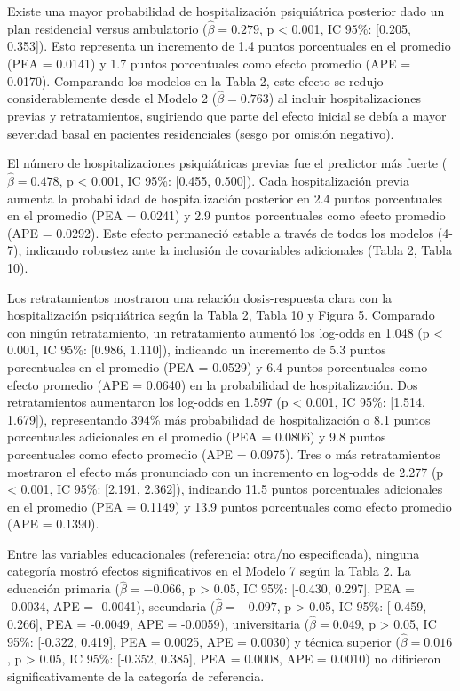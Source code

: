 \documentclass[
  spanish,
  10pt,
]{article}
\begin{document}
Existe una mayor probabilidad de hospitalización psiquiátrica posterior
dado un plan residencial versus ambulatorio (\(\hat{\beta} = 0.279\), p
\textless{} 0.001, IC 95\%: {[}0.205, 0.353{]}). Esto representa un
incremento de 1.4 puntos porcentuales en el promedio (PEA = 0.0141) y
1.7 puntos porcentuales como efecto promedio (APE = 0.0170). Comparando
los modelos en la Tabla 2, este efecto se redujo considerablemente desde
el Modelo 2 (\(\hat{\beta} = 0.763\)) al incluir hospitalizaciones
previas y retratamientos, sugiriendo que parte del efecto inicial se
debía a mayor severidad basal en pacientes residenciales (sesgo por
omisión negativo).

El número de hospitalizaciones psiquiátricas previas fue el predictor
más fuerte (\(\hat{\beta} = 0.478\), p \textless{} 0.001, IC 95\%:
{[}0.455, 0.500{]}). Cada hospitalización previa aumenta la probabilidad
de hospitalización posterior en 2.4 puntos porcentuales en el promedio
(PEA = 0.0241) y 2.9 puntos porcentuales como efecto promedio (APE =
0.0292). Este efecto permaneció estable a través de todos los modelos
(4-7), indicando robustez ante la inclusión de covariables adicionales
(Tabla 2, Tabla 10).

Los retratamientos mostraron una relación dosis-respuesta clara con la
hospitalización psiquiátrica según la Tabla 2, Tabla 10 y Figura 5.
Comparado con ningún retratamiento, un retratamiento aumentó los
log-odds en 1.048 (p \textless{} 0.001, IC 95\%: {[}0.986, 1.110{]}),
indicando un incremento de 5.3 puntos porcentuales en el promedio (PEA =
0.0529) y 6.4 puntos porcentuales como efecto promedio (APE = 0.0640) en
la probabilidad de hospitalización. Dos retratamientos aumentaron los
log-odds en 1.597 (p \textless{} 0.001, IC 95\%: {[}1.514, 1.679{]}),
representando 394\% más probabilidad de hospitalización o 8.1 puntos
porcentuales adicionales en el promedio (PEA = 0.0806) y 9.8 puntos
porcentuales como efecto promedio (APE = 0.0975). Tres o más
retratamientos mostraron el efecto más pronunciado con un incremento en
log-odds de 2.277 (p \textless{} 0.001, IC 95\%: {[}2.191, 2.362{]}),
indicando 11.5 puntos porcentuales adicionales en el promedio (PEA =
0.1149) y 13.9 puntos porcentuales como efecto promedio (APE = 0.1390).

Entre las variables educacionales (referencia: otra/no especificada),
ninguna categoría mostró efectos significativos en el Modelo 7 según la
Tabla 2. La educación primaria (\(\hat{\beta} = -0.066\), p
\textgreater{} 0.05, IC 95\%: {[}-0.430, 0.297{]}, PEA = -0.0034, APE =
-0.0041), secundaria (\(\hat{\beta} = -0.097\), p \textgreater{} 0.05,
IC 95\%: {[}-0.459, 0.266{]}, PEA = -0.0049, APE = -0.0059),
universitaria (\(\hat{\beta} = 0.049\), p \textgreater{} 0.05, IC 95\%:
{[}-0.322, 0.419{]}, PEA = 0.0025, APE = 0.0030) y técnica superior
(\(\hat{\beta} = 0.016\), p \textgreater{} 0.05, IC 95\%: {[}-0.352,
0.385{]}, PEA = 0.0008, APE = 0.0010) no difirieron significativamente
de la categoría de referencia.
\end{document}
